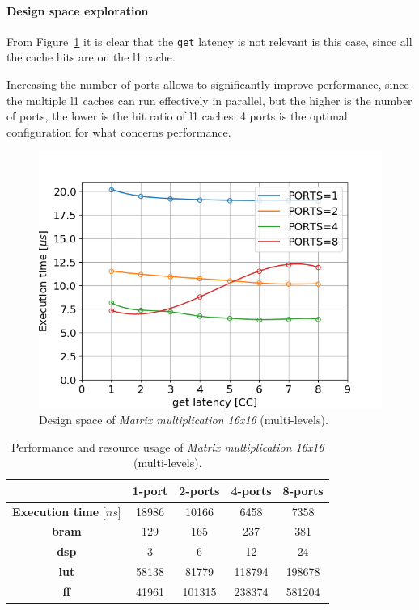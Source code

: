 \documentclass[11pt,a4paper,oneside]{memoir}
\begin{document}
\paragraph{Design space exploration}
From Figure~\ref{fig:matmul_16_l1_space} it is clear that the \texttt{get}
latency is not relevant is this case, since all the cache hits are on the
\ac{l1} cache.

Increasing the number of ports allows to significantly improve performance,
since the multiple \ac{l1} caches can run effectively in parallel, but the
higher is the number of ports, the lower is the hit ratio of \ac{l1} caches: 4
ports is the optimal configuration for what concerns performance.

\begin{figure}[H]
	\centering
	\includegraphics[width=.8\textwidth]{matmul_16_multiport_L1_latency}
	\caption{Design space of \emph{Matrix multiplication 16x16}
	(multi-levels).}
	\label{fig:matmul_16_l1_space}
\end{figure}

\begin{table}[H]
	\begin{center}
		\begin{tabular}{ccccc}
			\hline
			\rowcolor{gray!50}
			& \textbf{1-port} & \textbf{2-ports} & \textbf{4-ports}
			& \textbf{8-ports} \\
			\hline
			\textbf{Execution time} [$ns$] & 18986 & 10166 & 6458 &
			7358 \\
			\rowcolor{gray!25}
			\textbf{\ac{bram}} & 129 & 165 & 237 & 381 \\
			\textbf{\acs{dsp}} & 3 & 6 & 12 & 24 \\
			\rowcolor{gray!25}
			\textbf{\acs{lut}} & 58138 & 81779 & 118794 & 198678 \\
			\textbf{\acs{ff}} & 41961 & 101315 & 238374 & 581204 \\
			\hline
		\end{tabular}
	\end{center}
	\caption{Performance and resource usage of \emph{Matrix multiplication
	16x16} (multi-levels).}
	\label{tab:matmul_16_l1_ports_report}
\end{table}
\end{document}
